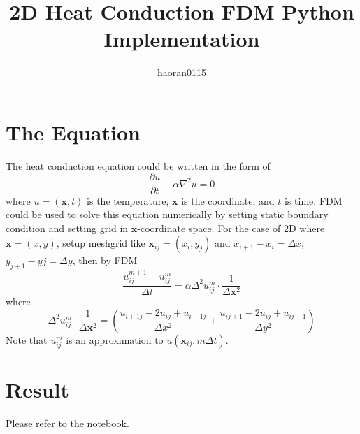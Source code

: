 \documentclass{article}
\title{2D Heat Conduction FDM Python Implementation}
\author{haoran0115}
\begin{document}
\maketitle

\section{The Equation}
The heat conduction equation could be written in the form of
\begin{equation}
    \frac{\partial u}{\partial t} - \alpha\nabla^2 u = 0
\end{equation}
where $u = (\mathbf{x}, t)$ is the temperature, $\mathbf{x}$ is the
coordinate, and $t$ is time.
FDM could be used to solve this equation numerically by setting static boundary
condition and setting grid in $\mathbf{x}$-coordinate space.
For the case of 2D where $\mathbf{x} = (x, y)$, setup meshgrid like
$\mathbf{x}_{ij} = (x_i, y_j)$ and $x_{i+1} - x_i = \Delta x$,
$y_{j+1} - y{j} = \Delta y$, then by FDM
\begin{equation}
    \frac{u_{ij}^{m+1} - u_{ij}^m}{\Delta t} =
    \alpha\Delta^2 u_{ij}^m\cdot\frac{1}{\Delta\mathbf{x}^2}
\end{equation}
where
\begin{equation}
    \Delta^2 u_{ij}^m\cdot\frac{1}{\Delta \mathbf{x}^2} = 
    \left(
        \frac{u_{i+1 j} - 2u_{ij} + u_{i-1j}}{\Delta x^2}+
        \frac{u_{ij+1} - 2u_{ij} + u_{ij-1}}{\Delta y^2}
    \right)
\end{equation}
Note that $u_{ij}^m$ is an approximation to $u(\mathbf{x}_{ij}, m\Delta t)$.

\section{Result}
Please refer to the \href{../notebook/main.ipynb}{notebook}.
\end{document}
